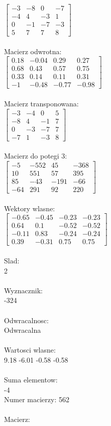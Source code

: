 \documentclass[a4paper,12pt]{article}
\begin{document}
$\begin{bmatrix} -3&-8&0&-7\\-4&4&-3&1\\0&-1&-7&-3\\5&7&7&8 \end{bmatrix}$
\\
\\
Macierz odwrotna:\\

$\begin{bmatrix} 0.18&-0.04&0.29&0.27\\0.68&0.43&0.57&0.75\\0.33&0.14&0.11&0.31\\-1&-0.48&-0.77&-0.98 \end{bmatrix}$
\\
\\
Macierz transponowana:\\

$\begin{bmatrix} -3&-4&0&5\\-8&4&-1&7\\0&-3&-7&7\\-7&1&-3&8 \end{bmatrix}$
\\
\\
Macierz do potegi 3:\\

$\begin{bmatrix} -5&-552&45&-368\\10&551&57&395\\85&-43&-191&-66\\-64&291&92&220 \end{bmatrix}$
\\
\\
Wektory wlasne:\\

$\begin{bmatrix} -0.65&-0.45&-0.23&-0.23\\0.64&0.1&-0.52&-0.52\\-0.11&0.83&-0.24&-0.24\\0.39&-0.31&0.75&0.75 \end{bmatrix}$
\\
\\
Slad:\\
2
\\
\\
Wyznacznik:\\
-324
\\
\\
Odwracalnosc:\\
Odwracalna
\\
\\
Wartosci wlasne:\\
9.18 -6.01 -0.58 -0.58
\\
\\
Suma elementow:\\
-4
\\
\newpage
Numer macierzy:
562
\\
\\
Macierz:\\
\end{document}
